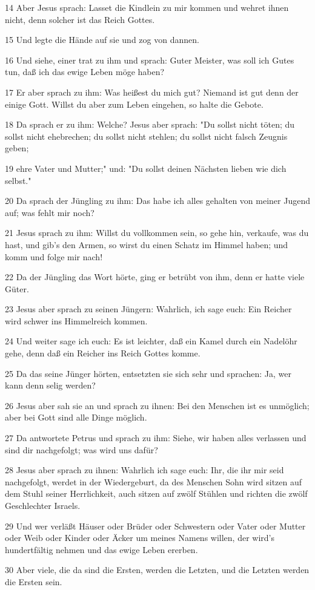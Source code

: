 \par 14 Aber Jesus sprach: Lasset die Kindlein zu mir kommen und wehret ihnen nicht, denn solcher ist das Reich Gottes.
\par 15 Und legte die Hände auf sie und zog von dannen.
\par 16 Und siehe, einer trat zu ihm und sprach: Guter Meister, was soll ich Gutes tun, daß ich das ewige Leben möge haben?
\par 17 Er aber sprach zu ihm: Was heißest du mich gut? Niemand ist gut denn der einige Gott. Willst du aber zum Leben eingehen, so halte die Gebote.
\par 18 Da sprach er zu ihm: Welche? Jesus aber sprach: "Du sollst nicht töten; du sollst nicht ehebrechen; du sollst nicht stehlen; du sollst nicht falsch Zeugnis geben;
\par 19 ehre Vater und Mutter;" und: "Du sollst deinen Nächsten lieben wie dich selbst."
\par 20 Da sprach der Jüngling zu ihm: Das habe ich alles gehalten von meiner Jugend auf; was fehlt mir noch?
\par 21 Jesus sprach zu ihm: Willst du vollkommen sein, so gehe hin, verkaufe, was du hast, und gib's den Armen, so wirst du einen Schatz im Himmel haben; und komm und folge mir nach!
\par 22 Da der Jüngling das Wort hörte, ging er betrübt von ihm, denn er hatte viele Güter.
\par 23 Jesus aber sprach zu seinen Jüngern: Wahrlich, ich sage euch: Ein Reicher wird schwer ins Himmelreich kommen.
\par 24 Und weiter sage ich euch: Es ist leichter, daß ein Kamel durch ein Nadelöhr gehe, denn daß ein Reicher ins Reich Gottes komme.
\par 25 Da das seine Jünger hörten, entsetzten sie sich sehr und sprachen: Ja, wer kann denn selig werden?
\par 26 Jesus aber sah sie an und sprach zu ihnen: Bei den Menschen ist es unmöglich; aber bei Gott sind alle Dinge möglich.
\par 27 Da antwortete Petrus und sprach zu ihm: Siehe, wir haben alles verlassen und sind dir nachgefolgt; was wird uns dafür?
\par 28 Jesus aber sprach zu ihnen: Wahrlich ich sage euch: Ihr, die ihr mir seid nachgefolgt, werdet in der Wiedergeburt, da des Menschen Sohn wird sitzen auf dem Stuhl seiner Herrlichkeit, auch sitzen auf zwölf Stühlen und richten die zwölf Geschlechter Israels.
\par 29 Und wer verläßt Häuser oder Brüder oder Schwestern oder Vater oder Mutter oder Weib oder Kinder oder Äcker um meines Namens willen, der wird's hundertfältig nehmen und das ewige Leben ererben.
\par 30 Aber viele, die da sind die Ersten, werden die Letzten, und die Letzten werden die Ersten sein.

